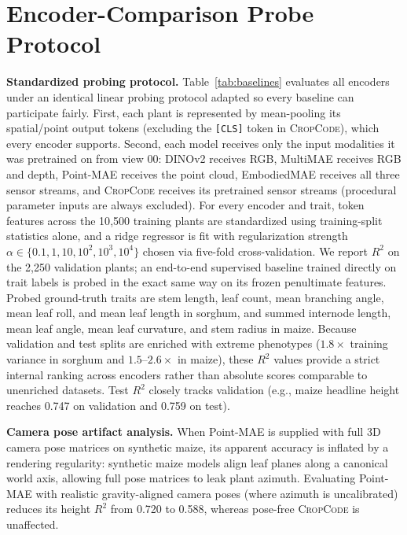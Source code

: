 \documentclass[10pt,twocolumn,letterpaper]{article}
\newcommand{\method}{\textsc{CropCode}}
\begin{document}
\section{Encoder-Comparison Probe Protocol}
\label{app:probe}

\noindent\textbf{Standardized probing protocol.}
Table~\ref{tab:baselines} evaluates all encoders under an identical linear probing protocol adapted so every baseline can participate fairly. First, each plant is represented by mean-pooling its spatial/point output tokens (excluding the \texttt{[CLS]} token in \method{}), which every encoder supports. Second, each model receives only the input modalities it was pretrained on from view 00: DINOv2 receives RGB, MultiMAE receives RGB and depth, Point-MAE receives the point cloud, EmbodiedMAE receives all three sensor streams, and \method{} receives its pretrained sensor streams (procedural parameter inputs are always excluded). For every encoder and trait, token features across the 10{,}500 training plants are standardized using training-split statistics alone, and a ridge regressor is fit with regularization strength $\alpha \in \{0.1, 1, 10, 10^2, 10^3, 10^4\}$ chosen via five-fold cross-validation. We report $R^2$ on the 2{,}250 validation plants; an end-to-end supervised baseline trained directly on trait labels is probed in the exact same way on its frozen penultimate features. Probed ground-truth traits are stem length, leaf count, mean branching angle, mean leaf roll, and mean leaf length in sorghum, and summed internode length, mean leaf angle, mean leaf curvature, and stem radius in maize. Because validation and test splits are enriched with extreme phenotypes ($1.8\times$ training variance in sorghum and $1.5\text{--}2.6\times$ in maize), these $R^2$ values provide a strict internal ranking across encoders rather than absolute scores comparable to unenriched datasets. Test $R^2$ closely tracks validation (e.g., maize headline height reaches 0.747 on validation and 0.759 on test).

\noindent\textbf{Camera pose artifact analysis.}
When Point-MAE is supplied with full 3D camera pose matrices on synthetic maize, its apparent accuracy is inflated by a rendering regularity: synthetic maize models align leaf planes along a canonical world axis, allowing full pose matrices to leak plant azimuth. Evaluating Point-MAE with realistic gravity-aligned camera poses (where azimuth is uncalibrated) reduces its height $R^2$ from 0.720 to 0.588, whereas pose-free \method{} is unaffected.
\end{document}
